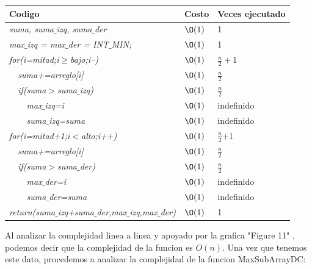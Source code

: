 \documentclass[spanish]{article}
\begin{document}
	\begin{center}
		\begin{table}[H]
			\begin{tabular}{|l|l|l|}
				\hline
				\rowcolor[HTML]{FFCC67} 
				Codigo                           & Costo & Veces ejecutado \\ \hline
				\textit{suma, suma$\_$izq, suma$\_$der}                    & $\O(1)$    & 1               \\ \hline
				\textit{max$\_$izq = max$\_$der = INT$\_$MIN;}                    & $\O(1)$    & 1               \\ \hline								
				\textit{for(i=mitad;i$\geq$bajo;i--)} & $\O(1)$    & $\frac{n}{2}+1$             \\ \hline
				\textit{\  \  suma+=arreglo[i]}                 & $\O(1)$    & $\frac{n}{2}$               \\ \hline
				\textit{\  \  if(suma$>$suma$\_$izq)}                 & $\O(1)$    & $\frac{n}{2}$               \\ \hline
				\textit{\  \  \  \  max$\_$izq=i}                     & $\O(1)$    & indefinido              \\ \hline
				\textit{\  \  \  \  suma$\_$izq=suma}                     & $\O(1)$    & indefinido              \\ \hline				
				\textit{for(i=mitad+1;i$<$alto;i++)} & $\O(1)$    & $\frac{n}{2}$+1             \\ \hline
				\textit{\  \  suma+=arreglo[i]}                 & $\O(1)$    & $\frac{n}{2}$               \\ \hline
				\textit{\  \  if(suma$>$suma$\_$der)}                 & $\O(1)$    & $\frac{n}{2}$               \\ \hline
				\textit{\  \  \  \  max$\_$der=i}                     & $\O(1)$    & indefinido              \\ \hline
				\textit{\  \  \  \  suma$\_$der=suma}                     & $\O(1)$    & indefinido              \\ \hline			
				\textit{return(suma$\_$izq+suma$\_$der,max$\_$izq,max$\_$der)}                     & $\O(1)$    & 1              \\ \hline			
			\end{tabular}
		\end{table}										
	\end{center}			
	Al analizar la complejidad linea a linea y apoyado por la grafica "Figure 11" , podemos decir que la complejidad de la funcion es $O(n)$.
	Una vez que tenemos este dato, procedemos a analizar la complejidad de la funcion MaxSubArrayDC:
\end{document}
